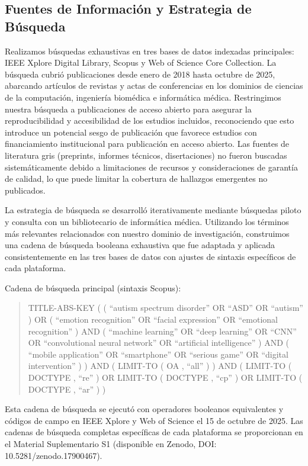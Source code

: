 \documentclass{ieeeaccess}
\begin{document}
	\subsection{Fuentes de Información y Estrategia de Búsqueda}
	Realizamos búsquedas exhaustivas en tres bases de datos indexadas principales: IEEE Xplore Digital Library, Scopus y Web of Science Core Collection. La búsqueda cubrió publicaciones desde enero de 2018 hasta octubre de 2025, abarcando artículos de revistas y actas de conferencias en los dominios de ciencias de la computación, ingeniería biomédica e informática médica. Restringimos nuestra búsqueda a publicaciones de acceso abierto para asegurar la reproducibilidad y accesibilidad de los estudios incluidos, reconociendo que esto introduce un potencial sesgo de publicación que favorece estudios con financiamiento institucional para publicación en acceso abierto. Las fuentes de literatura gris (preprints, informes técnicos, disertaciones) no fueron buscadas sistemáticamente debido a limitaciones de recursos y consideraciones de garantía de calidad, lo que puede limitar la cobertura de hallazgos emergentes no publicados.
	
	La estrategia de búsqueda se desarrolló iterativamente mediante búsquedas piloto y consulta con un bibliotecario de informática médica. Utilizando los términos más relevantes relacionados con nuestro dominio de investigación, construimos una cadena de búsqueda booleana exhaustiva que fue adaptada y aplicada consistentemente en las tres bases de datos con ajustes de sintaxis específicos de cada plataforma.
	
	Cadena de búsqueda principal (sintaxis Scopus):
	
	\begin{quote}
		\small
		TITLE-ABS-KEY ( ( ``autism spectrum disorder'' OR ``ASD'' OR ``autism'' ) OR ( ``emotion recognition'' OR ``facial expression'' OR ``emotional recognition'' ) AND ( ``machine learning'' OR ``deep learning'' OR ``CNN'' OR ``convolutional neural network'' OR ``artificial intelligence'' ) AND ( ``mobile application'' OR ``smartphone'' OR ``serious game'' OR ``digital intervention'' ) ) AND ( LIMIT-TO ( OA , ``all'' ) ) AND ( LIMIT-TO ( DOCTYPE , ``re'' ) OR LIMIT-TO ( DOCTYPE , ``cp'' ) OR LIMIT-TO ( DOCTYPE , ``ar'' ) )
	\end{quote}
	
	Esta cadena de búsqueda se ejecutó con operadores booleanos equivalentes y códigos de campo en IEEE Xplore y Web of Science el 15 de octubre de 2025. Las cadenas de búsqueda completas específicas de cada plataforma se proporcionan en el Material Suplementario S1 (disponible en Zenodo, DOI: 10.5281/zenodo.17900467).
	
\end{document}
